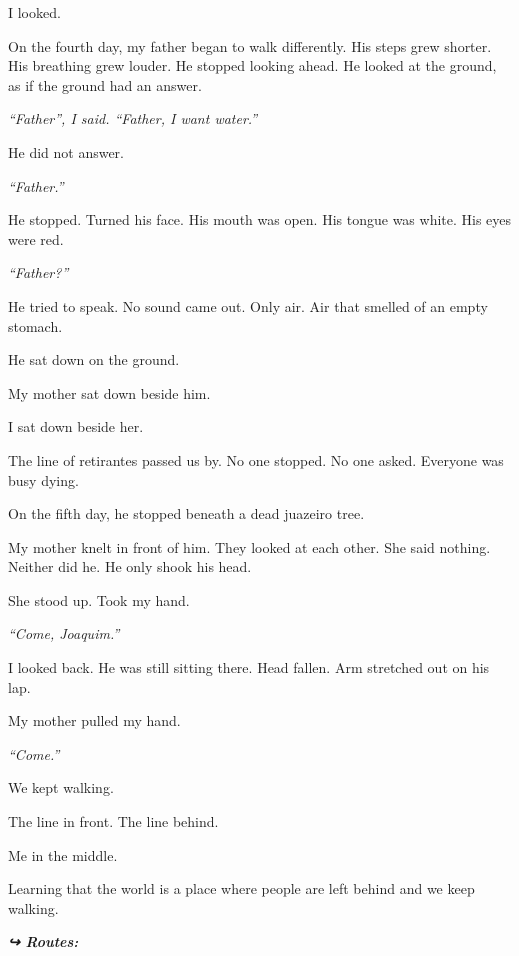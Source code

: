 \noindent I looked.

\noindent On the fourth day, my father began to walk differently. His steps grew shorter. His breathing grew louder. He stopped looking ahead. He looked at the ground, as if the ground had an answer.

\noindent \textit{\textquotedblleft{}Father\textquotedblright{}\textit{, I said. }\textquotedblleft{}Father, I want water.\textquotedblright{}}

\noindent He did not answer.

\noindent \textit{\textquotedblleft{}Father.\textquotedblright{}}

\noindent He stopped. Turned his face. His mouth was open. His tongue was white. His eyes were red.

\noindent \textit{\textquotedblleft{}Father?\textquotedblright{}}

\noindent He tried to speak. No sound came out. Only air. Air that smelled of an empty stomach.

\noindent He sat down on the ground.

\noindent My mother sat down beside him.

\noindent I sat down beside her.

\noindent The line of retirantes passed us by. No one stopped. No one asked. Everyone was busy dying.

\noindent On the fifth day, he stopped beneath a dead juazeiro tree.

\noindent My mother knelt in front of him. They looked at each other. She said nothing. Neither did he. He only shook his head.

\noindent She stood up. Took my hand.

\noindent \textit{\textquotedblleft{}Come, Joaquim.\textquotedblright{}}

\noindent I looked back. He was still sitting there. Head fallen. Arm stretched out on his lap.

\noindent My mother pulled my hand.

\noindent \textit{\textquotedblleft{}Come.\textquotedblright{}}

\noindent We kept walking.

\noindent The line in front. The line behind.

\noindent Me in the middle.

\noindent Learning that the world is a place where people are left behind and we keep walking.

\vspace{0.5em}
\noindent\textit{\textbf{↪ Routes:}  \rotasep {} \rotasep {}}
